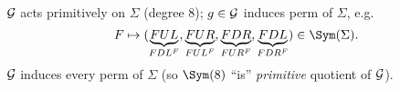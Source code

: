 \begin{slide}
    \begin{center}
    \end{center}

    $\mathcal{G}$ acts primitively on $\Sigma$ (degree 8); $g \in \mathcal{G}$ induces perm of $\Sigma$, e.g. \pause
    $$F \mapsto (\underbrace{FUL}_{FDL^F},\underbrace{FUR}_{FUL^F},\underbrace{FDR}_{FUR^F},\underbrace{FDL}_{FDR^F}) \in \Sym(\Sigma).$$ \pause
    $\mathcal{G}$ induces every perm of $\Sigma$ (so $\Sym(8)$ ``is'' \textit{primitive} quotient of $\mathcal{G}$).
\end{slide}